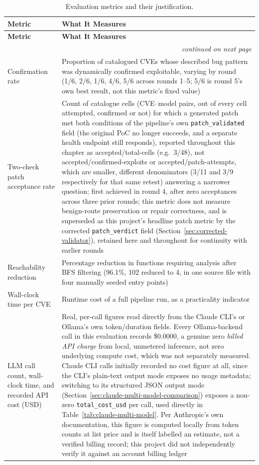 \documentclass[12pt,a4paper]{report}
\begin{document}
\begin{longtable}{@{}p{4cm}p{9cm}@{}}
\caption{Evaluation metrics and their justification.}
\label{tab:evaluation-metrics} \\
\toprule
\textbf{Metric} & \textbf{What It Measures} \\
\midrule
\endfirsthead
\toprule
\textbf{Metric} & \textbf{What It Measures} \\
\midrule
\endhead
\midrule
\multicolumn{2}{r}{\footnotesize\emph{continued on next page}} \\
\endfoot
\bottomrule
\endlastfoot
Confirmation rate & Proportion of catalogued CVEs whose described bug pattern was dynamically confirmed exploitable, varying by round (1/6, 2/6, 1/6, 4/6, 5/6 across rounds 1--5; 5/6 is round 5's own best result, not this metric's fixed value) \\
Two-check patch acceptance rate & Count of catalogue cells (CVE--model pairs, out of every cell attempted, confirmed or not) for which a generated patch met both conditions of the pipeline's own \texttt{patch\_validated} field (the original PoC no longer succeeds, and a separate health endpoint still responds), reported throughout this chapter as accepted/total-cells (e.g.\ 3/48), not accepted/confirmed-exploits or accepted/patch-attempts, which are smaller, different denominators (3/11 and 3/9 respectively for that same retest) answering a narrower question; first achieved in round 4, after zero acceptances across three prior rounds; this metric does not measure benign-route preservation or repair correctness, and is superseded as this project's headline patch metric by the corrected \texttt{patch\_verdict} field (Section~\ref{sec:corrected-validator}), retained here and throughout for continuity with earlier rounds \\
Reachability reduction & Percentage reduction in functions requiring analysis after BFS filtering (96.1\%, 102 reduced to 4, in one source file with four manually seeded entry points) \\
Wall-clock time per CVE & Runtime cost of a full pipeline run, as a practicality indicator \\
LLM call count, wall-clock time, and recorded API cost (USD) & Real, per-call figures read directly from the Claude CLI's or Ollama's own token/duration fields. Every Ollama-backend call in this evaluation records \$0.0000, a genuine zero \emph{billed API charge} from local, unmetered inference, not zero underlying compute cost, which was not separately measured. Claude CLI calls initially recorded no cost figure at all, since the CLI's plain-text output mode exposes no usage metadata; switching to its structured JSON output mode (Section~\ref{sec:claude-multi-model-comparison}) exposes a non-zero \texttt{total\_cost\_usd} per call, used directly in Table~\ref{tab:claude-multi-model}. Per Anthropic's own documentation, this figure is computed locally from token counts at list price and is itself labelled an estimate, not a verified billing record; this project did not independently verify it against an account billing ledger \\
\end{longtable}
\end{document}
